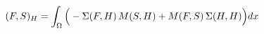 \documentclass[preview]{standalone}
\begin{document}
\begin{align*}
\special{dvisvgm:raw <g id='unique000'>}(F,S)_H=\int_\Omega\Big(-\Sigma(F,H)\,M(S,H)+M(F,S)\,\Sigma(H,H)\Big)dx\special{dvisvgm:raw </g>}
\end{align*}
\end{document}
